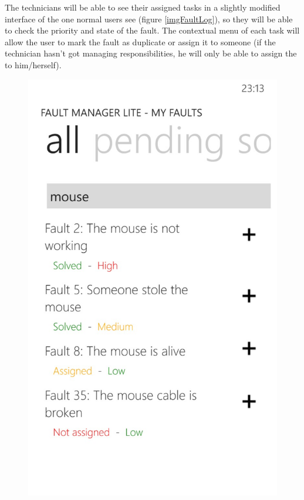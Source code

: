 \documentclass{report}
\begin{document}
The technicians will be able to see their assigned tasks in a slightly modified interface of the one normal users see (figure \ref{imgFaultLog}), so they will be able to check the priority and state of the fault. The contextual menu of each task will allow the user to mark the fault as duplicate or assign it to someone (if the technician hasn't got managing responsibilities, he will only be able to assign the to him/herself).

\begin{figure}[hbtp]
\centering
\begin{minipage}{0.3\textwidth}
\includegraphics[width=\textwidth]{img/TechFaultLog.jpg}

\end{minipage}
\end{figure}
\end{document}

